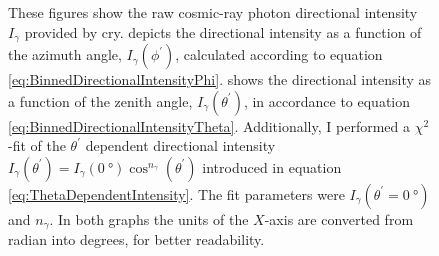\begin{figure}[htbp]
    \centering
    \caption[Raw Cosmic-Ray Photon Directional Intensity Provided by CRY]{These figures show the raw cosmic-ray photon directional intensity $I_\gamma$ provided by \gls{cry}.  depicts the directional intensity as a function of the azimuth angle, $I_\gamma(\phi^{\prime})$, calculated according to equation \ref{eq:BinnedDirectionalIntensityPhi}.  shows the directional intensity as a function of the zenith angle, $I_\gamma(\theta^{\prime})$, in accordance to equation \ref{eq:BinnedDirectionalIntensityTheta}. Additionally, I performed a $\chi^2$-fit of the $\theta^\prime$ dependent directional intensity $I_\gamma(\theta^\prime) = I_\gamma(\SI{0}{\degree}) \cos^{n_{\gamma}}{(\theta^\prime)}$ introduced in equation \ref{eq:ThetaDependentIntensity}. The fit parameters were $I_\gamma(\theta^{\prime}=\SI{0}{\degree})$ and $n_\gamma$. In both graphs the units of the $X$-axis are converted from radian into degrees, for better readability.}
    \label{fig:CRYDirectionalIntensity}
\end{figure}
